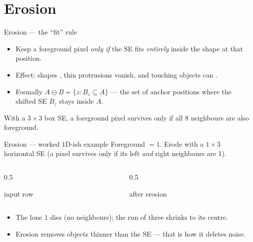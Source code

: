 \documentclass[10pt,aspectratio=169]{beamer}
\begin{document}
\section{Erosion}

\begin{frame}{Erosion — the ``fit'' rule}
  \begin{itemize}
    \item Keep a foreground pixel \emph{only if} the SE fits \emph{entirely} inside the shape at that position.
    \item Effect: shapes , thin protrusions vanish, and touching objects can .
    \item Formally $A \ominus B = \{z : B_z \subseteq A\}$ — the set of anchor positions where the shifted SE $B_z$ stays inside $A$.
  \end{itemize}
  \begin{mathbox}
    With a $3\times3$ box SE, a foreground pixel survives only if all 8 neighbours are also foreground.
  \end{mathbox}
\end{frame}

\begin{frame}{Erosion — worked $1$D-ish example}
  Foreground $=1$. Erode with a $1\times3$ horizontal SE (a pixel survives only if its left \emph{and} right neighbours are 1).
  \begin{columns}[T]
    \begin{column}{0.5\textwidth}\begin{center}
      {\scriptsize input row}\\[2pt]
    \end{center}\end{column}
    \begin{column}{0.5\textwidth}\begin{center}
      {\scriptsize after erosion}\\[2pt]
    \end{center}\end{column}
  \end{columns}
  \vspace{2pt}
  \begin{itemize}
    \item The lone $1$ dies (no neighbours); the run of three shrinks to its centre.
    \item Erosion removes objects thinner than the SE — that is how it deletes noise.
  \end{itemize}
\end{frame}
\end{document}

